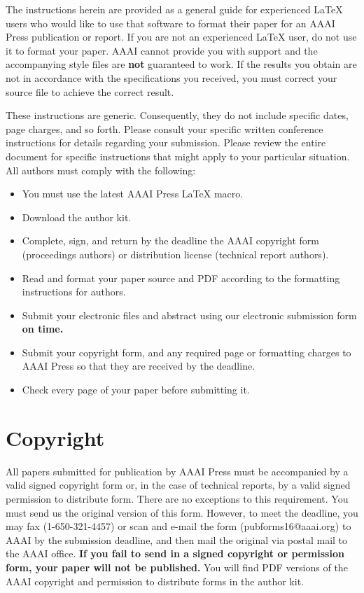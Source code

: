 \documentclass[letterpaper]{article}
\begin{document}
The instructions herein are provided as a general guide for experienced \LaTeX{} users who would like to use that software to format their paper for an AAAI Press publication or report. If you are not an experienced \LaTeX{} user, do not use it to format your paper. AAAI cannot provide you with support and the accompanying style files are \textbf{not} guaranteed to work. If the results you obtain are not in accordance with the specifications you received, you must correct your source file to achieve the correct result. 

These instructions are generic. Consequently, they do not include specific dates, page charges, and so forth. Please consult your specific written conference instructions for details regarding your submission. Please review the entire document for specific instructions that might apply to your particular situation. All authors must comply with the following:

\begin{itemize}
\item You must use the latest AAAI Press \LaTeX{} macro.
\item Download the author kit.
\item Complete, sign, and return by the deadline the AAAI copyright form (proceedings authors) or distribution license (technical report authors).
\item Read and format your paper source and PDF according to the formatting instructions for authors.
\item Submit your electronic files and abstract using our electronic submission form \textbf{on time.}
\item Submit your copyright form, and any required page or formatting charges to AAAI Press so that they are received by the deadline.
\item Check every page of your paper before submitting it.
\end{itemize}

\section{Copyright}
All papers submitted for publication by AAAI Press must be accompanied by a valid signed copyright form or, in the case of technical reports, by a valid signed permission to distribute form. There are no exceptions to this requirement. You must send us the original version of this form. However, to meet the deadline, you may fax (1-650-321-4457) or scan and e-mail the form (pubforms16@aaai.org) to AAAI by the submission deadline, and then mail the original via postal mail to the AAAI office. \textbf{If you fail to send in a signed copyright or permission form, your paper will not be published.} You will find PDF versions of the AAAI copyright and permission to distribute forms in the author kit.
\end{document}
